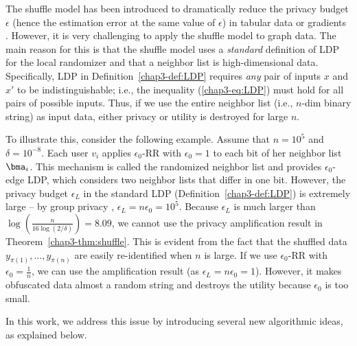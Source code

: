 The shuffle model has been introduced to dramatically reduce the privacy budget $\epsilon$ (hence the estimation error at the same value of $\epsilon$) in tabular data \cite{Wang_PVLDB20} or 
gradients 
\cite{Girgis_AISTATS21,Liu_AAAI21}. 
However, it is very challenging to apply the shuffle model to graph data. 
The main reason for this is that 
the shuffle model uses a \textit{standard} definition of LDP for the local randomizer and that a neighbor list is high-dimensional data. 
Specifically, LDP in Definition~\ref{chap3-def:LDP} requires \textit{any} pair of inputs $x$ and $x'$ to be indistinguishable; i.e., 
the inequality (\ref{chap3-eq:LDP}) must hold for all pairs of possible inputs. 
Thus, if we use the entire neighbor list (i.e., $n$-dim binary string) as input data, 
either privacy or utility is destroyed for large $n$. 

To illustrate this, consider the following example. 
Assume that $n=10^5$ and $\delta=10^{-8}$. 
Each user $v_i$ applies 
$\epsilon_0$-RR 
with $\epsilon_0=1$ to each bit of her neighbor list $\bma_i$. 
This mechanism is called the randomized neighbor list \cite{qin2017generating} and provides $\epsilon_0$-edge LDP, which considers two neighbor lists that differ in one bit. 
However, the privacy budget $\epsilon_L$ in the standard LDP (Definition~\ref{chap3-def:LDP}) 
is extremely large -- by group privacy \cite{DP}, $\epsilon_L = n \epsilon_0 = 10^5$. 
Because 
$\epsilon_L$ 
is much larger than $\log (\frac{n}{16 \log (2/\delta)}) = 8.09$, we cannot use the privacy amplification result in Theorem~\ref{chap3-thm:shuffle}. 
This is evident from the fact that the shuffled data $y_{\pi(1)}, \ldots, y_{\pi(n)}$ are easily re-identified when $n$ is large. 
If we use 
$\epsilon_0$-RR 
with $\epsilon_0 = \frac{1}{n}$, we can use the amplification result (as $\epsilon_L = n \epsilon_0 = 1$). 
However, it makes obfuscated data almost a random string and destroys the utility because $\epsilon_0$ is too small. 

In this work, we address this issue by introducing several new algorithmic ideas, as explained below. 


